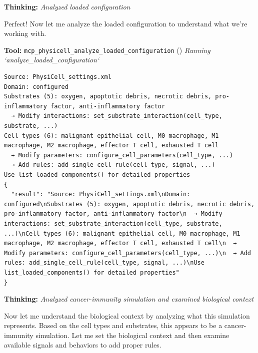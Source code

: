 \documentclass[11pt,a4paper]{article}
\begin{document}
\begin{thinkbox}
\textbf{Thinking:} \textit{Analyzed loaded configuration}

Perfect! Now let me analyze the loaded configuration to understand what we're working with.

\end{thinkbox}
\begin{toolokbox}
\textbf{Tool:} \texttt{mcp\_physicell\_analyze\_loaded\_configuration} (\checkmark)
\textit{Running `analyze\_loaded\_configuration`}
\begin{lstlisting}
Source: PhysiCell_settings.xml
Domain: configured
Substrates (5): oxygen, apoptotic debris, necrotic debris, pro-inflammatory factor, anti-inflammatory factor
  → Modify interactions: set_substrate_interaction(cell_type, substrate, ...)
Cell types (6): malignant epithelial cell, M0 macrophage, M1 macrophage, M2 macrophage, effector T cell, exhausted T cell
  → Modify parameters: configure_cell_parameters(cell_type, ...)
  → Add rules: add_single_cell_rule(cell_type, signal, ...)
Use list_loaded_components() for detailed properties
{
  "result": "Source: PhysiCell_settings.xml\nDomain: configured\nSubstrates (5): oxygen, apoptotic debris, necrotic debris, pro-inflammatory factor, anti-inflammatory factor\n  → Modify interactions: set_substrate_interaction(cell_type, substrate, ...)\nCell types (6): malignant epithelial cell, M0 macrophage, M1 macrophage, M2 macrophage, effector T cell, exhausted T cell\n  → Modify parameters: configure_cell_parameters(cell_type, ...)\n  → Add rules: add_single_cell_rule(cell_type, signal, ...)\nUse list_loaded_components() for detailed properties"
}
\end{lstlisting}
\end{toolokbox}
\begin{thinkbox}
\textbf{Thinking:} \textit{Analyzed cancer-immunity simulation and examined biological context}

Now let me understand the biological context by analyzing what this simulation represents. Based on the cell types and substrates, this appears to be a cancer-immunity simulation. Let me set the biological context and then examine available signals and behaviors to add proper rules.

\end{thinkbox}
\end{document}
